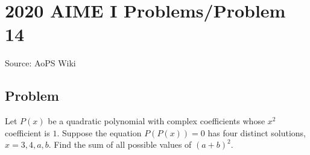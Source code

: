 \documentclass[12pt]{article}
\begin{document}
\section*{{2020 AIME I Problems/Problem 14}}
Source: AoPS Wiki

\subsection*{Problem}
Let $P(x)$ be a quadratic polynomial with complex coefficients whose $x^2$ coefficient is $1.$ Suppose the equation $P(P(x))=0$ has four distinct solutions, $x=3,4,a,b.$ Find the sum of all possible values of $(a+b)^2.$
\end{document}

